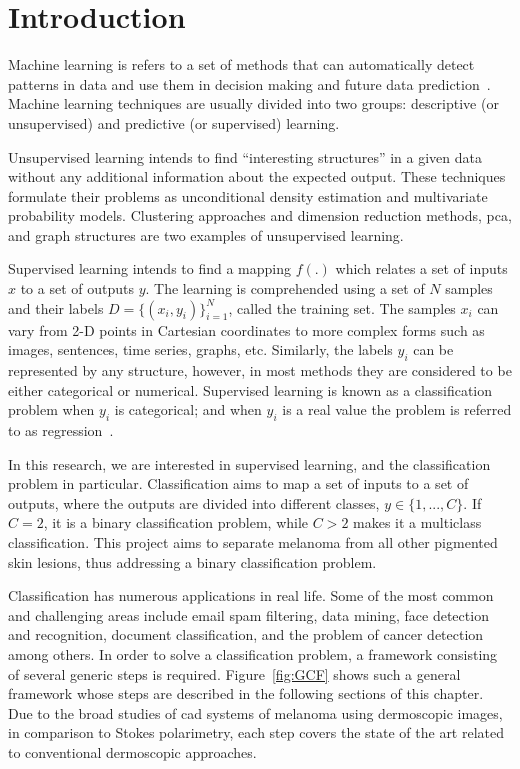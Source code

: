 \section{Introduction} \label{sec:chp2-sec1}
Machine learning is refers to a set of methods that can automatically detect patterns in data and use them in decision making and future data prediction~\cite{murphy2012machine}. 
Machine learning techniques are usually divided into two groups: descriptive (or unsupervised) and predictive (or supervised) learning.

Unsupervised learning intends to find ``interesting structures'' in a given data without any additional information about the expected output. 
These techniques formulate their problems as unconditional density estimation and multivariate probability models. 
Clustering approaches and dimension reduction methods, \acf{pca}, and graph structures are two examples of unsupervised learning.   

Supervised learning intends to find a mapping $f(.)$ which relates a set of inputs $x$ to a set of outputs $y$. 
The learning is comprehended using a set of $N$ samples and their labels $D = \{(x_{i}, y_{i})\}^{N}_{i = 1}$, called the training set.
The samples $x_{i}$ can vary from 2-D points in Cartesian coordinates to more complex forms such as images, sentences, time series, graphs, etc.
Similarly, the labels $y_{i}$ can be represented by any structure, however, in most methods they are considered to be either categorical or numerical. 
Supervised learning is known as a classification problem when $y_{i}$ is categorical; and when $y_{i}$ is a real value the problem is referred to as regression~\cite{murphy2012machine}. 

In this research, we are interested in supervised learning, and the classification problem in particular. 
Classification aims to map a set of inputs to a set of outputs, where the outputs are divided into different classes, $y \in \{1,...,C\}$.
If $C = 2$, it is a binary classification problem, while $C > 2$ makes it a multiclass classification. 
This project aims to separate melanoma from all other pigmented skin lesions, thus addressing a binary classification problem. 

Classification has numerous applications in real life.
Some of the most common and challenging areas include email spam filtering, data mining, face detection and recognition, document classification, and the problem of cancer detection among others.
In order to solve a classification problem, a framework consisting of several generic steps is required.
Figure~\ref{fig:GCF} shows such a general framework whose steps are described in the following sections of this chapter. 
Due to the broad studies of \ac{cad} systems of melanoma using dermoscopic images, in comparison to Stokes polarimetry, each step covers the state of the art related to conventional dermoscopic approaches.
 
